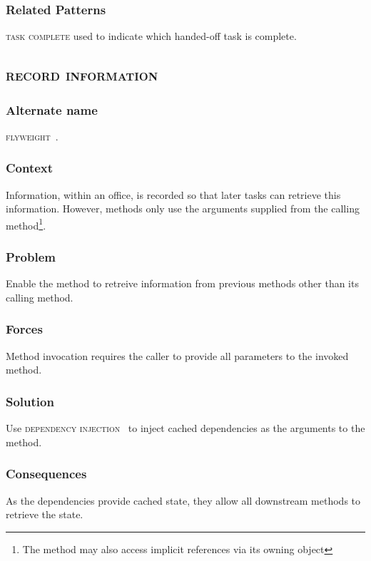 \documentclass[prodmode]{style/acmlarge}
\begin{document}
\subsubsection*{Related Patterns} \textsc{task complete} used to indicate which
handed-off task is complete.



\subsection{\textsc{\textbf{record information}}}

\subsubsection*{Alternate name} \textsc{flyweight}~\cite{gof}.

\subsubsection*{Context} Information, within an office, is recorded so that
later tasks can retrieve this information.  However, methods only use the
arguments supplied from the calling method\footnote{The method may also access
implicit references via its owning object}.

\subsubsection*{Problem} Enable the method to retreive information from previous
methods other than its calling method.

\subsubsection*{Forces} Method invocation requires the caller to provide all
parameters to the invoked method.

\subsubsection*{Solution} Use \textsc{dependency injection}~\cite{ioc} to inject
cached dependencies as the arguments to the method.

\subsubsection*{Consequences} As the dependencies provide cached state, they
allow all downstream methods to retrieve the state.
\end{document}
